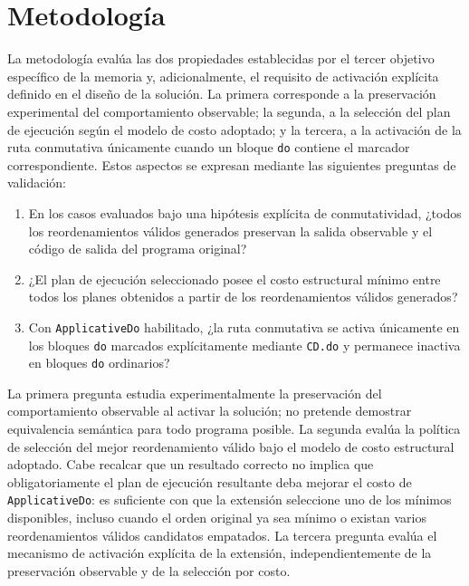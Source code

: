 
\section{Metodología}
\label{sec:validacion-metodologia}

La metodología evalúa las dos propiedades establecidas por el tercer objetivo específico de la memoria y, adicionalmente, el requisito de activación explícita definido en el diseño de la solución. La primera corresponde a la preservación experimental del comportamiento observable; la segunda, a la selección del plan de ejecución según el modelo de costo adoptado; y la tercera, a la activación de la ruta conmutativa únicamente cuando un bloque \texttt{do} contiene el marcador correspondiente. Estos aspectos se expresan mediante las siguientes preguntas de validación:

\begin{enumerate}
    \item[\textbf{PV1.}] En los casos evaluados bajo una hipótesis explícita de conmutatividad, ¿todos los reordenamientos válidos generados preservan la salida observable y el código de salida del programa original?
    \item[\textbf{PV2.}] ¿El plan de ejecución seleccionado posee el costo estructural mínimo entre todos los planes obtenidos a partir de los reordenamientos válidos generados?
    \item[\textbf{PV3.}] Con \texttt{ApplicativeDo} habilitado, ¿la ruta conmutativa se activa únicamente en los bloques \texttt{do} marcados explícitamente mediante \texttt{CD.do} y permanece inactiva en bloques \texttt{do} ordinarios?
\end{enumerate}

La primera pregunta estudia experimentalmente la preservación del comportamiento observable al activar la solución; no pretende demostrar equivalencia semántica para todo programa posible. La segunda evalúa la política de selección del mejor reordenamiento válido bajo el modelo de costo estructural adoptado. Cabe recalcar que un resultado correcto no implica que obligatoriamente el plan de ejecución resultante deba mejorar el costo de \texttt{ApplicativeDo}: es suficiente con que la extensión seleccione uno de los mínimos disponibles, incluso cuando el orden original ya sea mínimo o existan varios reordenamientos válidos candidatos empatados. La tercera pregunta evalúa el mecanismo de activación explícita de la extensión, independientemente de la preservación observable y de la selección por costo.

